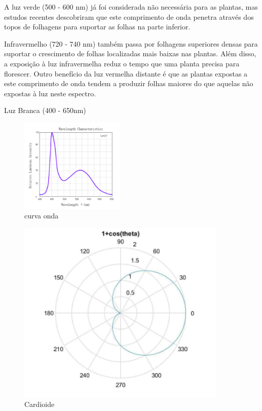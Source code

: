A luz verde (500 - 600 nm) já foi considerada não necessária para as plantas, mas estudos recentes descobriram que este comprimento de onda penetra através dos topos de folhagens  para suportar as folhas na parte inferior.


Infravermelho (720 - 740 nm) também passa por folhagens superiores densas para suportar o crescimento de folhas localizadas mais baixas nas plantas. Além disso, a exposição à luz infravermelha reduz o tempo que uma planta precisa para florescer. Outro benefício da luz vermelha distante é que as plantas expostas a este comprimento de onda tendem a produzir folhas maiores do que aquelas não expostas à luz neste espectro.


Luz Branca (400 - 650nm)

\begin{figure}[H]
	\centering
	\includegraphics[width=5cm]{figuras/curva_onda.png}
	\caption{curva onda} \label{curva onda}
\end{figure}

\begin{figure}[H]
	\centering
	\includegraphics[width=10cm]{figuras/Cardioide.png}
	\caption{Cardioide} \label{Cardioide}
\end{figure}

